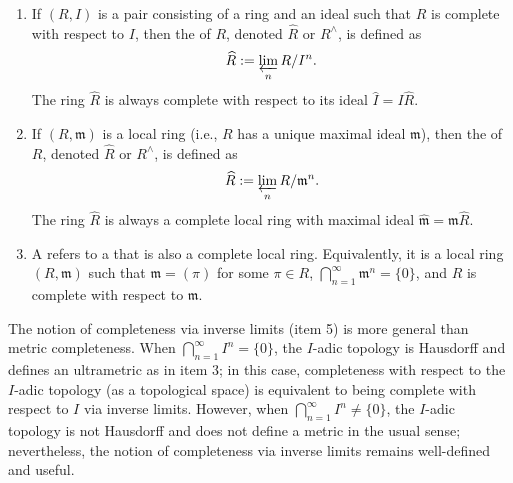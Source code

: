 \begin{definition}
\begin{enumerate}
        \item If $(R, I)$ is a pair consisting of a ring and an ideal such that $R$ is complete with respect to $I$, then the  of $R$, denoted $\widehat{R}$ or $R^\wedge$, is defined as
        $$
            \widehat{R} := \varprojlim_{n} R/I^n.
        $$
        The ring $\widehat{R}$ is always complete with respect to its ideal $\widehat{I} = I\widehat{R}$.

        \item If $(R, \mathfrak{m})$ is a local ring (i.e., $R$ has a unique maximal ideal $\mathfrak{m}$), then the  of $R$, denoted $\widehat{R}$ or $R^\wedge$, is defined as
        $$
            \widehat{R} := \varprojlim_{n} R/\mathfrak{m}^n.
        $$
        The ring $\widehat{R}$ is always a complete local ring with maximal ideal $\widehat{\mathfrak{m}} = \mathfrak{m}\widehat{R}$.

        \item A  refers to a  that is also a complete local ring. Equivalently, it is a local ring $(R, \mathfrak{m})$ such that $\mathfrak{m} = (\pi)$ for some $\pi \in R$, $\bigcap_{n=1}^\infty \mathfrak{m}^n = \{0\}$, and $R$ is complete with respect to $\mathfrak{m}$.
    \end{enumerate}

    \begin{remark}
        The notion of completeness via inverse limits (item 5) is more general than metric completeness. When $\bigcap_{n=1}^\infty I^n = \{0\}$, the $I$-adic topology is Hausdorff and defines an ultrametric as in item 3; in this case, completeness with respect to the $I$-adic topology (as a topological space) is equivalent to being complete with respect to $I$ via inverse limits. However, when $\bigcap_{n=1}^\infty I^n \neq \{0\}$, the $I$-adic topology is not Hausdorff and does not define a metric in the usual sense; nevertheless, the notion of completeness via inverse limits remains well-defined and useful.
    \end{remark}
\end{definition}
